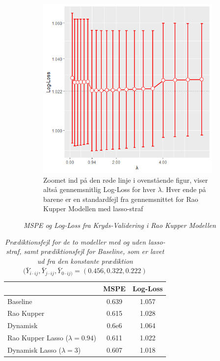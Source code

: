 \documentclass[11pt,a4paper]{article}
\begin{document}
\begin{figure}[htb!]
\begin{subfigure}[b]{0.4\textwidth}
    \includegraphics[width=\textwidth]{STATLOGLOSSBARNY1.png}
    \caption{Zoomet ind på den røde linje i ovenstående figur, viser altså gennemsnitlig Log-Loss for hver $\lambda$. Hver ende på barene er en standardfejl fra gennemsnittet for Rao Kupper Modellen med lasso-straf}
    \label{fig:LogLossBarStat}  
    \end{subfigure}
\caption{\textit{MSPE og Log-Loss fra Kryds-Validering i Rao Kupper Modellen}}
\label{fig:MSPELOGLOSSStatisk}
\end{figure}
\begin{table}[ht]
\centering
\begin{adjustbox}{max width=\textwidth}
\begin{tabular}{|l|cc|}
\hline 
 & MSPE & Log-Loss  \\
 \hline
Baseline & 0.639 & 1.057 \\
Rao Kupper & 0.615 & 1.028 \\
Dynamisk & 0.6e6 & 1.064 \\
Rao Kupper Lasso ($\lambda=0.94$)& 0.611 & 1.022 \\
Dynamisk Lasso ($\lambda=3$) & 0.607 & 1.018 \\
   \hline   
\end{tabular} 
\end{adjustbox}
\caption{\label{tab:KVMSPELOGLOSS}\textit{Prædiktionsfejl for de to modeller med og uden lasso-straf, samt prædiktionsfejl for Baseline, som er lavet ud fra den konstante prædiktion $(\bar{Y}_{i \cdot ij},\bar{Y}_{j \cdot ij}, \bar{Y}_{0 \cdot ij)} = (0.456,0.322,0.222)$}}
\end{table}
\end{document}
